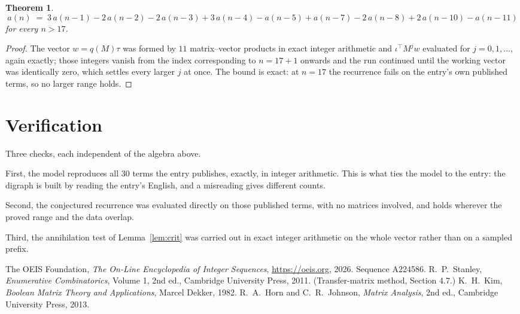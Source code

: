 \documentclass[11pt,a4paper]{article}
\theoremstyle{plain}
\newtheorem{theorem}{Theorem}
\theoremstyle{definition}
\begin{document}
\begin{theorem}
\[
a(n)\;=\;3\,a(n-1) - 2\,a(n-2) - 2\,a(n-3) + 3\,a(n-4) - a(n-5) + a(n-7) - 2\,a(n-8) + 2\,a(n-10) - a(n-11)
\]
for every $n>17$.
\end{theorem}

\begin{proof}
The vector $w=q(M)\tau$ was formed by $11$ matrix--vector products in exact integer
arithmetic and $\iota^{\!\top}M^{j}w$ evaluated for $j=0,1,\dots$, again exactly; those
integers vanish from the index corresponding to $n=17+1$ onwards and the run continued
until the working vector was identically zero, which settles every larger $j$ at once. The bound is exact: at $n=17$ the recurrence fails on the entry's own published terms, so no larger range holds.
\end{proof}

\section{Verification}

Three checks, each independent of the algebra above.

First, the model reproduces all $30$ terms the entry publishes, exactly, in integer
arithmetic. This is what ties the model to the entry: the digraph is built by reading the
entry's English, and a misreading gives different counts.

Second, the conjectured recurrence was evaluated directly on those published terms, with no
matrices involved, and holds wherever the proved range and the data overlap.

Third, the annihilation test of Lemma~\ref{lem:crit} was carried out in exact integer
arithmetic on the whole vector rather than on a sampled prefix.

\begin{thebibliography}{9}
 The OEIS Foundation, \emph{The On-Line Encyclopedia of Integer
Sequences}, \url{https://oeis.org}, 2026. Sequence A224586.
 R.~P.~Stanley, \emph{Enumerative Combinatorics}, Volume 1, 2nd ed.,
Cambridge University Press, 2011. (Transfer-matrix method, Section 4.7.)
 K.~H.~Kim, \emph{Boolean Matrix Theory and Applications}, Marcel Dekker,
1982.
 R.~A.~Horn and C.~R.~Johnson, \emph{Matrix Analysis}, 2nd ed., Cambridge
University Press, 2013.
\end{thebibliography}
\end{document}
